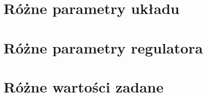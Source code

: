 \section{Różne parametry układu}

\section{Różne parametry regulatora}

\section{Różne wartości zadane}
